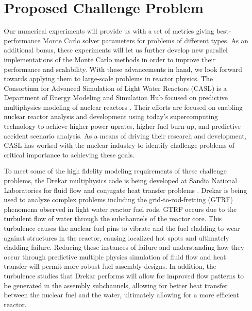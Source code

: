 \section{Proposed Challenge Problem}
\label{sec:challenge_problem}
Our numerical experiments will provide us with a set of metrics giving
best-performance Monte Carlo solver parameters for problems of
different types. As an additional bonus, these experiments will let us
further develop new parallel implementations of the Monte Carlo methods
in order to improve their performance and scalability. With these
advancements in hand, we look forward towards applying them to
large-scale problems in reactor physics. The Consortium for Advanced
Simulation of Light Water Reactors (CASL) is a Department of Energy
Modeling and Simulation Hub focused on predictive multiphysics
modeling of nuclear reactors
\citep{u.s._department_of_energy_casl_2011}. Their efforts are focused
on enabling nuclear reactor analysis and development using today's
supercomputing technology to achieve higher power uprates, higher fuel
burn-up, and predictive accident scenario analysis. As a means of
driving their research and development, CASL has worked with the
nuclear industry to identify challenge problems of critical importance
to achieving these goals.

To meet some of the high fidelity modeling requirements of these
challenge problems, the Drekar multiphysics code is being developed at
Sandia National Laboratories for fluid flow and conjugate heat
transfer problems \citep{pawlowski_drekar_2012}. Drekar is being
used to analyze complex problems including the grid-to-rod-fretting
(GTRF) phenomena observed in light water reactor fuel rods. GTRF
occurs due to the turbulent flow of water through the subchannels of
the reactor core. This turbulence causes the nuclear fuel pins to
vibrate and the fuel cladding to wear against structures in the
reactor, causing localized hot spots and ultimately cladding
failure. Reducing these instances of failure and understanding how
they occur through predictive multiple physics simulation of fluid
flow and heat transfer will permit more robust fuel assembly
designs. In addition, the turbulence studies that Drekar performs will
allow for improved flow patterns to be generated in the assembly
subchannels, allowing for better heat transfer between the nuclear
fuel and the water, ultimately allowing for a more efficient reactor.

